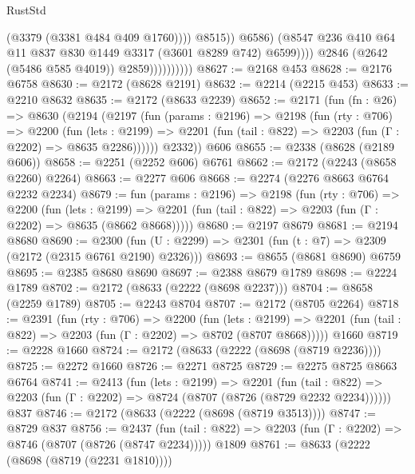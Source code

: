 \begin{lexlean}{RustStd}
\begin{coremodule}
                                        (@3379 (@3381 @484 @409 @1760))))
                                    @8515))
                                @6586)
                              (@8547
                                @236
                                @410
                                @64
                                @11
                                @837
                                @830
                                @1449
                                @3317
                                (@3601 @8289 @742)
                                @6599))))
                        @2846
                        (@2642 (@5486 @585 @4019))
                        @2859))))))))))
@8627 := @2168 @453
@8628 := @2176 @6758
@8630 := @2172 (@8628 @2191)
@8632 := @2214 (@2215 @453)
@8633 := @2210 @8632
@8635 := @2172 (@8633 @2239)
@8652 := @2171
    (fun (fn : @26) =>
    @8630
      (@2194
        (@2197
          (fun (params : @2196) =>
          @2198
            (fun (rty : @706) =>
            @2200
              (fun (lets : @2199) =>
              @2201 (fun (tail : @822) => @2203 (fun (Γ : @2202) => @8635 @2286))))))
        @2332))
    @606
@8655 := @2338 (@8628 (@2189 @606))
@8658 := @2251 (@2252 @606) @6761
@8662 := @2172 (@2243 (@8658 @2260) @2264)
@8663 := @2277 @606
@8668 := @2274 (@2276 @8663 @6764 @2232 @2234)
@8679 := fun (params : @2196) =>
  @2198
    (fun (rty : @706) =>
    @2200
      (fun (lets : @2199) =>
      @2201 (fun (tail : @822) => @2203 (fun (Γ : @2202) => @8635 (@8662 @8668)))))
@8680 := @2197 @8679
@8681 := @2194 @8680
@8690 := @2300 (fun (U : @2299) => @2301 (fun (t : @7) => @2309 (@2172 (@2315 @6761 @2190) @2326)))
@8693 := @8655 (@8681 @8690) @6759
@8695 := @2385 @8680 @8690
@8697 := @2388 @8679 @1789
@8698 := @2224 @1789
@8702 := @2172 (@8633 (@2222 (@8698 @2237)))
@8704 := @8658 (@2259 @1789)
@8705 := @2243 @8704
@8707 := @2172 (@8705 @2264)
@8718 := @2391
    (fun (rty : @706) =>
    @2200
      (fun (lets : @2199) =>
      @2201 (fun (tail : @822) => @2203 (fun (Γ : @2202) => @8702 (@8707 @8668)))))
    @1660
@8719 := @2228 @1660
@8724 := @2172 (@8633 (@2222 (@8698 (@8719 @2236))))
@8725 := @2272 @1660
@8726 := @2271 @8725
@8729 := @2275 @8725 @8663 @6764
@8741 := @2413
    (fun (lets : @2199) =>
    @2201
      (fun (tail : @822) => @2203 (fun (Γ : @2202) => @8724 (@8707 (@8726 (@8729 @2232 @2234))))))
    @837
@8746 := @2172 (@8633 (@2222 (@8698 (@8719 @3513))))
@8747 := @8729 @837
@8756 := @2437
    (fun (tail : @822) => @2203 (fun (Γ : @2202) => @8746 (@8707 (@8726 (@8747 @2234)))))
    @1809
@8761 := @8633 (@2222 (@8698 (@8719 (@2231 @1810))))

\end{coremodule}
\end{lexlean}
